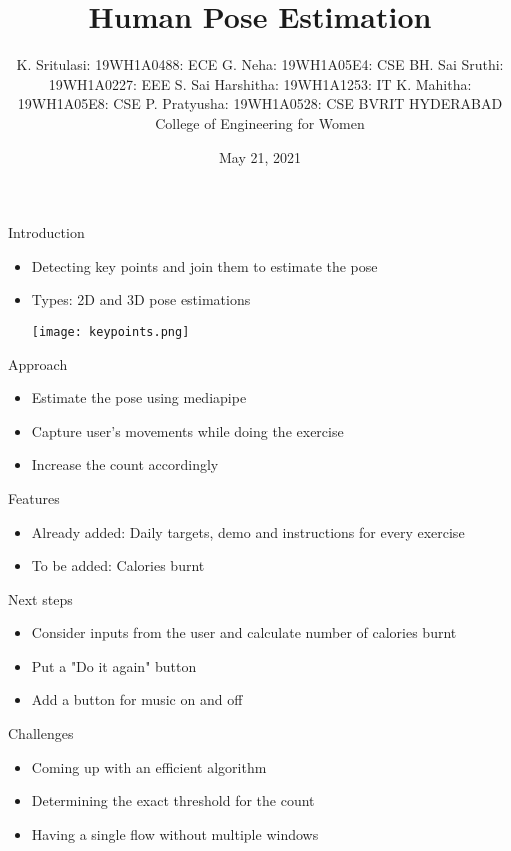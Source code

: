 \documentclass[14pt]{beamer}
\title{Human Pose Estimation}
\author[]{K. Sritulasi: 19WH1A0488: ECE \vspace*{0.1cm} \newline G. Neha: 19WH1A05E4: CSE \vspace*{0.1cm} \newline BH. Sai Sruthi: 19WH1A0227: EEE \vspace*{0.1cm} \newline S. Sai Harshitha: 19WH1A1253: IT \vspace*{0.1cm} \newline K. Mahitha: 19WH1A05E8: CSE \vspace*{0.1cm} \newline P. Pratyusha: 19WH1A0528: CSE \newline \vspace*{0.2cm} \small {\newline BVRIT HYDERABAD College of Engineering for Women}}
\date{May 21, 2021}
\begin{document}
\begin{frame}
	\titlepage
\end{frame}

\begin{frame}{Introduction}
\begin{itemize}
	\item Detecting key points and join them to estimate the pose
	\item Types: 2D and 3D pose estimations
		\begin{center}
			\texttt{[image: keypoints.png]}
		\end{center}

\end{itemize}
\end{frame}

\begin{frame}{Approach}
		\begin{itemize}
			\item Estimate the pose using mediapipe
			\item Capture user's movements while doing the exercise
			\item Increase the count accordingly
		\end{itemize}
\end{frame}

\begin{frame}{Features}
	\begin{itemize}
		\item Already added: Daily targets, demo and instructions for every exercise
		\item To be added: Calories burnt
	\end{itemize}
\end{frame}

\begin{frame}{Next steps}
\begin{itemize}
	\item Consider inputs from the user and calculate number of calories burnt
	\item Put a "Do it again" button
	\item Add a button for music on and off
\end{itemize}
\end{frame}

\begin{frame}{Challenges}
	\begin{itemize}
		\item Coming up with an efficient algorithm
		\item Determining the exact threshold for the count
		\item Having a single flow without multiple windows
	\end{itemize}
\end{frame}
\end{document}

